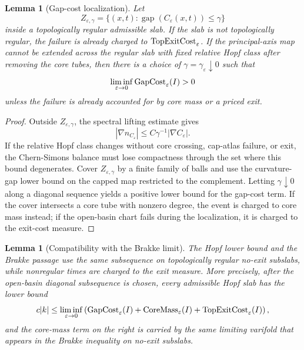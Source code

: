 \documentclass[11pt]{article}
\newtheorem{lemma}[theorem]{Lemma}
\theoremstyle{definition}
\newcommand{\eps}{\varepsilon}
\newcommand{\gap}{\operatorname{gap}}
\begin{document}
\begin{lemma}[Gap-cost localization]
\label{lem:app-gap-localization}
Let
\[
        Z_{\eps,\gamma}
        =
        \{(x,t):\gap(C_\eps(x,t))\le\gamma\}
\]
inside a topologically regular admissible slab.  If the slab is not
topologically regular, the failure is already charged to
\({\rm TopExitCost}_\eps\).  If the principal-axis map cannot be extended across
the regular slab with fixed relative Hopf class after removing the core tubes,
then there is a choice of \(\gamma=\gamma_\eps\downarrow0\) such that
\[
        \liminf_{\eps\to0}
        {\rm GapCost}_\eps(I)>0
\]
unless the failure is already accounted for by core mass or a priced exit.
\end{lemma}

\begin{proof}
Outside \(Z_{\eps,\gamma}\), the spectral lifting estimate gives
\[
        |\nabla n_{C_\eps}|
        \le
        C\gamma^{-1}|\nabla C_\eps|.
\]
If the relative Hopf class changes without core crossing, cap-atlas failure, or
exit, the Chern-Simons balance must lose compactness through the set where this
bound degenerates.  Cover \(Z_{\eps,\gamma}\) by a finite family of balls and use the
curvature-gap lower bound on the capped map restricted to the complement.
Letting \(\gamma\downarrow0\) along a diagonal sequence yields a positive lower
bound for the gap-cost term.  If the cover intersects a core tube with nonzero
degree, the event is charged to core mass instead; if the open-basin chart
fails during the localization, it is charged to the exit-cost measure.
\end{proof}

\begin{lemma}[Compatibility with the Brakke limit]
\label{lem:app-hopf-brakke-compatibility}
The Hopf lower bound and the Brakke passage use the same subsequence on
topologically regular no-exit subslabs, while nonregular times are charged to
the exit measure.  More precisely, after the open-basin diagonal subsequence is
chosen, every admissible Hopf slab has the lower bound
\[
        c|k|
        \le
        \liminf_{\eps\to0}
        \left(
        {\rm GapCost}_\eps(I)
        +
        {\rm CoreMass}_\eps(I)
        +
        {\rm TopExitCost}_\eps(I)
        \right),
\]
and the core-mass term on the right is carried by the same limiting varifold
that appears in the Brakke inequality on no-exit subslabs.
\end{lemma}
\end{document}
